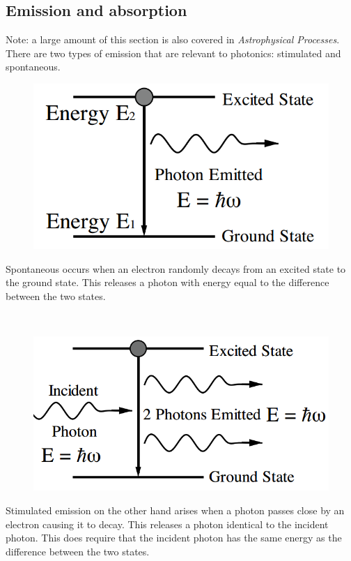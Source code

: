 \subsection{Emission and absorption}
Note: a large amount of this section is also covered in \textit{Astrophysical Processes}.
\\
There are two types of emission that are relevant to photonics: stimulated and spontaneous.
\begin{minipage}{0.47\linewidth}
	\begin{figure} [H]
		\includegraphics[width = \linewidth]{Photonics/spontanemiss}
	\end{figure}
\end{minipage}
\begin{minipage}{0.47\linewidth}
	Spontaneous occurs when an electron randomly decays from an excited state to the ground state.
	This releases a photon with energy equal to the difference between the two states. 
\end{minipage}
\\
\begin{minipage}{0.47\linewidth}
	\begin{figure} [H]
		\includegraphics[width = \linewidth]{Photonics/stimuemiss}
	\end{figure}
\end{minipage}
\begin{minipage}{0.47\linewidth}
	Stimulated emission on the other hand arises when a photon passes close by an electron causing it to decay. This releases a photon identical to the incident photon. This does require that the incident photon has the same energy as the difference between the two states. 
\end{minipage}
\\
